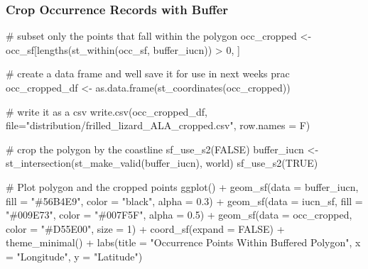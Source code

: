 \documentclass[
  letterpaper,
  DIV=11,
  numbers=noendperiod]{scrartcl}
\newenvironment{Shaded}{\begin{snugshade}}{\end{snugshade}}
\newcommand{\AttributeTok}[1]{\textcolor[rgb]{0.40,0.45,0.13}{#1}}
\newcommand{\CommentTok}[1]{\textcolor[rgb]{0.37,0.37,0.37}{#1}}
\newcommand{\ConstantTok}[1]{\textcolor[rgb]{0.56,0.35,0.01}{#1}}
\newcommand{\DecValTok}[1]{\textcolor[rgb]{0.68,0.00,0.00}{#1}}
\newcommand{\FloatTok}[1]{\textcolor[rgb]{0.68,0.00,0.00}{#1}}
\newcommand{\FunctionTok}[1]{\textcolor[rgb]{0.28,0.35,0.67}{#1}}
\newcommand{\NormalTok}[1]{\textcolor[rgb]{0.00,0.23,0.31}{#1}}
\newcommand{\OtherTok}[1]{\textcolor[rgb]{0.00,0.23,0.31}{#1}}
\newcommand{\SpecialCharTok}[1]{\textcolor[rgb]{0.37,0.37,0.37}{#1}}
\newcommand{\StringTok}[1]{\textcolor[rgb]{0.13,0.47,0.30}{#1}}
\begin{document}
\subsubsection{Crop Occurrence Records with
Buffer}\label{crop-occurrence-records-with-buffer}

\begin{Shaded}
\begin{Highlighting}[]
\CommentTok{\# subset only the points that fall within the polygon}
\NormalTok{occ\_cropped }\OtherTok{\textless{}{-}}\NormalTok{ occ\_sf[}\FunctionTok{lengths}\NormalTok{(}\FunctionTok{st\_within}\NormalTok{(occ\_sf, buffer\_iucn)) }\SpecialCharTok{\textgreater{}} \DecValTok{0}\NormalTok{, ]}

\CommentTok{\# create a data frame and we\textquotesingle{}ll save it for use in next week\textquotesingle{}s prac}
\NormalTok{occ\_cropped\_df }\OtherTok{\textless{}{-}} \FunctionTok{as.data.frame}\NormalTok{(}\FunctionTok{st\_coordinates}\NormalTok{(occ\_cropped))}

\CommentTok{\# write it as a csv}
\FunctionTok{write.csv}\NormalTok{(occ\_cropped\_df, }\AttributeTok{file=}\StringTok{"distribution/frilled\_lizard\_ALA\_cropped.csv"}\NormalTok{, }\AttributeTok{row.names =}\NormalTok{ F)}

\CommentTok{\# crop the polygon by the coastline}
\FunctionTok{sf\_use\_s2}\NormalTok{(}\ConstantTok{FALSE}\NormalTok{)}
\NormalTok{buffer\_iucn }\OtherTok{\textless{}{-}} \FunctionTok{st\_intersection}\NormalTok{(}\FunctionTok{st\_make\_valid}\NormalTok{(buffer\_iucn), world)}
\FunctionTok{sf\_use\_s2}\NormalTok{(}\ConstantTok{TRUE}\NormalTok{)}

\CommentTok{\# Plot polygon and the cropped points}
\FunctionTok{ggplot}\NormalTok{() }\SpecialCharTok{+}
  \FunctionTok{geom\_sf}\NormalTok{(}\AttributeTok{data =}\NormalTok{ buffer\_iucn, }\AttributeTok{fill =} \StringTok{"\#56B4E9"}\NormalTok{, }\AttributeTok{color =} \StringTok{"black"}\NormalTok{, }\AttributeTok{alpha =} \FloatTok{0.3}\NormalTok{) }\SpecialCharTok{+}
  \FunctionTok{geom\_sf}\NormalTok{(}\AttributeTok{data =}\NormalTok{ iucn\_sf, }\AttributeTok{fill =} \StringTok{"\#009E73"}\NormalTok{, }\AttributeTok{color =} \StringTok{"\#007F5F"}\NormalTok{, }\AttributeTok{alpha =} \FloatTok{0.5}\NormalTok{) }\SpecialCharTok{+}
  \FunctionTok{geom\_sf}\NormalTok{(}\AttributeTok{data =}\NormalTok{ occ\_cropped, }\AttributeTok{color =} \StringTok{"\#D55E00"}\NormalTok{, }\AttributeTok{size =} \DecValTok{1}\NormalTok{) }\SpecialCharTok{+}
  \FunctionTok{coord\_sf}\NormalTok{(}\AttributeTok{expand =} \ConstantTok{FALSE}\NormalTok{) }\SpecialCharTok{+}
  \FunctionTok{theme\_minimal}\NormalTok{() }\SpecialCharTok{+}
  \FunctionTok{labs}\NormalTok{(}\AttributeTok{title =} \StringTok{"Occurrence Points Within Buffered Polygon"}\NormalTok{,}
       \AttributeTok{x =} \StringTok{"Longitude"}\NormalTok{, }\AttributeTok{y =} \StringTok{"Latitude"}\NormalTok{)}
\end{Highlighting}
\end{Shaded}
\end{document}

